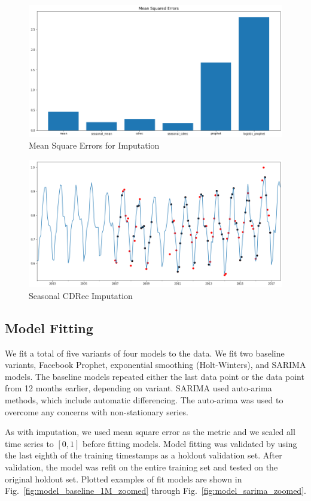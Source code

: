 \documentclass[9pt,twocolumn,twoside, lineno]{jost-new}
\numberwithin{subsection}{section}
\begin{document}
\begin{figure}
\centering
    \includegraphics[width=14.4cm]{figures/impute_mse.png}
\caption{Mean Square Errors for Imputation}
\label{fig:impute_mse}
\end{figure}
\begin{figure}
\centering
    \includegraphics[width=14.4cm]{figures/impute_seasonal_cdrec.png}
\caption{Seasonal CDRec Imputation}
\label{fig:impute_seasonal_cdrec}
\end{figure}

\subsection{Model Fitting}
We fit a total of five variants of four models to the data.
We fit two baseline variants, Facebook Prophet, exponential smoothing (Holt-Winters), and SARIMA models.
The baseline models repeated either the last data point or the data point from 12 months earlier, depending on variant.
SARIMA used auto-arima methods, which include automatic differencing.
The auto-arima was used to overcome any concerns with non-stationary series.

As with imputation, we used mean square error as the metric and we scaled all time series to $[0,1]$ before fitting models.
Model fitting was validated by using the last eighth of the training timestamps as a holdout validation set.
After validation, the model was refit on the entire training set and tested on the original holdout set.
Plotted examples of fit models are shown in Fig.~\ref{fig:model_baseline_1M_zoomed} through Fig.~\ref{fig:model_sarima_zoomed}.
\end{document}

